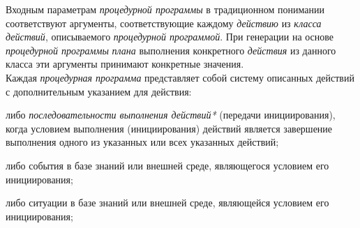 \begin{SCn}
\begin{scnsubstruct}
\begin{scnindent}
{                Входным параметрам \textit{процедурной программы} в традиционном понимании соответствуют аргументы, соответствующие каждому \textit{действию} из \textit{класса действий}, описываемого \textit{процедурной программой}. При генерации на основе \textit{процедурной программы} \textit{плана} выполнения конкретного \textit{действия} из данного класса эти аргументы принимают конкретные значения.\\
                Каждая \textit{процедурная программа} представляет собой систему описанных действий с дополнительным указанием для действия:
	            \begin{scnitemize}
	                \item либо \textit{последовательности выполнения действий*} (передачи инициирования), когда условием выполнения (инициирования) действий является завершение выполнения одного из указанных или всех указанных действий;
	                \item либо события в базе знаний или внешней среде, являющегося условием его инициирования;
	                \item либо ситуации в базе знаний или внешней среде, являющейся условием его инициирования;
	            \end{scnitemize}}
         \end{scnindent}
	     \begin{scnindent}
	     \end{scnindent}

\end{scnsubstruct}
\end{SCn}
